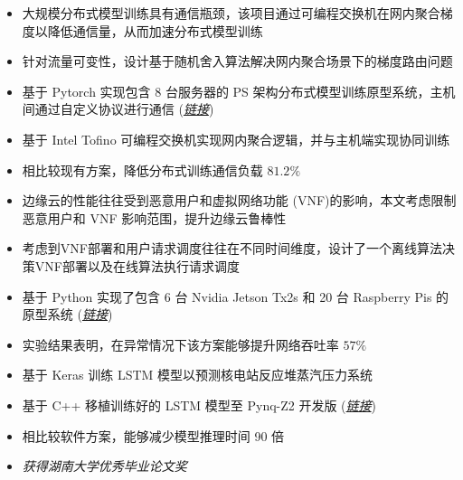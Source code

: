 \documentclass{resume}
\begin{document}
\begin{itemize}[parsep=0.5ex]
  \item 大规模分布式模型训练具有通信瓶颈，该项目通过可编程交换机在网内聚合梯度以降低通信量，从而加速分布式模型训练
  \item 针对流量可变性，设计基于随机舍入算法解决网内聚合场景下的梯度路由问题
  \item 基于 Pytorch 实现包含 8 台服务器的 PS 架构分布式模型训练原型系统，主机间通过自定义协议进行通信 (\href{https://github.com/Fangjin98/distributed-training-INA/}{\textit{链接}})
  \item 基于 Intel Tofino 可编程交换机实现网内聚合逻辑，并与主机端实现协同训练
  \item 相比较现有方案，降低分布式训练通信负载 $81.2\%$
\end{itemize}

\begin{itemize}[parsep=0.5ex]
  \item 边缘云的性能往往受到恶意用户和虚拟网络功能 (VNF)的影响，本文考虑限制恶意用户和 VNF 影响范围，提升边缘云鲁棒性
  \item 考虑到VNF部署和用户请求调度往往在不同时间维度，设计了一个离线算法决策VNF部署以及在线算法执行请求调度
  \item 基于 Python 实现了包含 6 台 Nvidia Jetson Tx2s 和 20 台 Raspberry Pis 的原型系统 (\href{https://github.com/Fangjin98/reveal-src}{\textit{链接}})
  \item 实验结果表明，在异常情况下该方案能够提升网络吞吐率 $57\%$
\end{itemize}

\begin{itemize}[parsep=0.5ex]
  \item 基于 Keras 训练 LSTM 模型以预测核电站反应堆蒸汽压力系统
  \item 基于 C++ 移植训练好的 LSTM 模型至 Pynq-Z2 开发版 (\href{https://github.com/Fangjin98/vivado-hls-rnn}{\textit{链接}})
  \item 相比较软件方案，能够减少模型推理时间 90 倍
  \item \textit{获得湖南大学优秀毕业论文奖}
\end{itemize}
\end{document}
